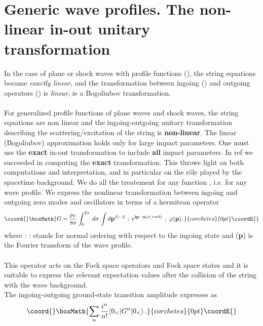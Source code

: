 \documentclass[12pt,a4paper]{article}
\begin{document}
\section{Generic wave profiles. The non-linear in-out unitary transformation}
In the case of plane or shock waves with profile functions (\coordHE{}), 
the string equations became {\it exactly linear}, and the transformation 
between ingoing (\myHighlight{$\langle $}\coordHE{}) and outgoing operators (\myHighlight{$\rangle $}\coordHE{}) is 
{\it linear}, ie a Bogoliubov transformation. \\ \\
For generalized profile functions of plane waves and shock waves, the string 
equations are non linear and the ingoing-outgoing unitary transformation 
describing the scattering/excitation of the string is {\bf non-linear}. 
The linear (Bogoliubov) approximation holds only for large impact parameters. 
One must use the {\bf exact} in-out transformation to include {\bf all} 
impact parameters. In ref \cite{vs6} we succeeded in computing the 
{\bf exact} transformation. This throws light on both computations and 
interpretation, and in particular on the r\^{o}le played by the spacetime 
background. We do all the treatement for any function \coordHE{}, i.e. for 
any wave profile. We express the nonlinear transformation between 
ingoing and outgoing zero modes and oscillators in terms of a hermitean 
operator
\begin{displaymath}\coord{}\boxMath{
G = \frac{p_U}{8\pi } \int^{2\pi }_0 \: d\sigma \, \int d{\bf p}^{D-2} \, : 
\, e^{{\bf ip-x}(\sigma ,\tau =0)}\, : \, \varphi ({\bf p}), 
}{corchetes}{0pt}\coordE{}\end{displaymath}
where : : stands for normal ordering with respect to the ingoing state 
\coordHE{} and \myHighlight{$\varphi$}\coordHE{}({\bf p}) is the Fourier transform of the 
wave profile. \\ \\
This operator acts on the Fock space operators and Fock space states and 
it is suitable to express the relevant expectation values after the 
collision of the string with the wave background.\\
The ingoing-outgoing ground-state transition amplitude \coordHE{} expresses as 
\begin{displaymath}\coord{}\boxMath{
\sum _n \frac{i^n}{n!} \langle 0_<|G^n|0_< \rangle \,.
}{corchetes}{0pt}\coordE{}\end{displaymath}
\end{document}
